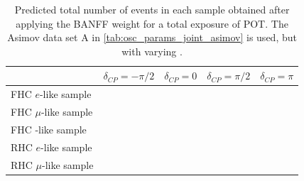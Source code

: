 \begin{table}
\center
\begin{tabular} { | l ||r | r | r | r | }
	\hline
	&	$\delta_{CP}=-\pi/2$	&	$\delta_{CP}=0$	&	$\delta_{CP}=\pi/2$	&	$\delta_{CP}=\pi$	\\ \hline\hline
	FHC $e$-like sample				&  &  &  & \\ \hline
	FHC $\mu$-like sample			&  &  &  & \\ \hline
	FHC \nueCConepi{}-like sample	&  &  &  & \\ \hline
	RHC $e$-like sample				&  &  &  & \\ \hline
	RHC $\mu$-like sample			&  &  &  & \\ \hline
	
\end{tabular}
\caption{
Predicted total number of events in each sample obtained after applying the BANFF weight for a total exposure of \TotalPotNu{} POT. The Asimov data set A in \cref{tab:osc_params_joint_asimov} is used, but with varying \deltacp.
}
\label{tab:events_asimov_a_dcp_var_1re}
\end{table}


